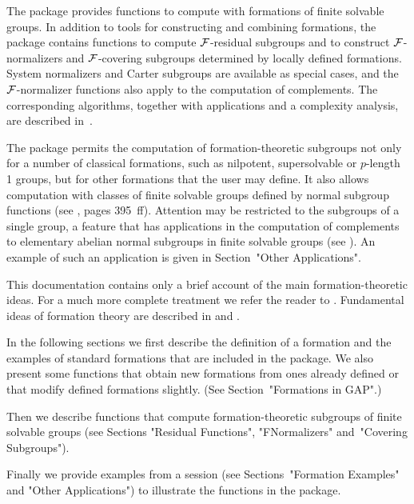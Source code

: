 
\def\F{{\cal{F}}}


The {\GAP} package {\FORMAT} provides functions to compute with formations 
of finite solvable groups.  In addition to tools for constructing and 
combining formations, the package contains functions to compute 
$\F$-residual subgroups and to construct $\F$-normalizers and 
$\F$-covering subgroups determined by locally defined formations. 
System normalizers and Carter subgroups are available as special cases, 
and the $\F$-normalizer functions also apply to the computation of 
complements. The corresponding algorithms, together with applications 
and a complexity analysis, are described in~\cite{EW}. 

The package permits the computation of formation-theoretic subgroups 
not only for a number of classical formations, such as nilpotent,
supersolvable or $p$-length 1 groups, but for other formations that the
user may define. It also allows computation with classes of
finite solvable groups defined by normal subgroup functions (see
\cite{DH}, pages 395~ff). Attention may be restricted to the
subgroups of a single group, a feature that has applications
in the computation of complements to elementary abelian normal subgroups
in finite solvable groups (see \cite{EW}). An example of such an 
application is given in Section~"Other Applications".

This documentation contains only a brief account of the main 
formation-theoretic ideas. For a much more complete treatment we
refer the reader to \cite{DH}. Fundamental ideas of formation theory are
described in \cite{G} and \cite{CH}.

In the following sections we first describe the {\GAP} definition of a
formation and the examples of standard formations that are included in 
the package. We also present some functions that obtain new formations 
from ones already defined or that modify defined formations slightly.
(See Section~"Formations in GAP".) 

Then we describe functions that compute formation-theoretic subgroups 
of finite solvable groups (see Sections "Residual Functions", 
"FNormalizers" and~"Covering Subgroups"). 

Finally we provide examples from a {\GAP} session (see Sections~"Formation
Examples" and "Other Applications") to illustrate the functions in the package.

